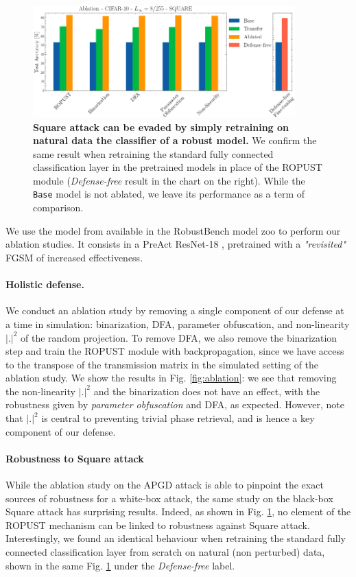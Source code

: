 \begin{figure}
    \centering
    \includegraphics[width=0.9\textwidth]{sections/appendix/ropust_icassp2022/ablation_square.png}
    \caption{\textbf{Square attack can be evaded by simply retraining on natural data the classifier of a robust model.} We confirm the same result when retraining the standard fully connected classification layer in the pretrained models in place of the ROPUST module (\textit{Defense-free} result in the chart on the right). While the \texttt{Base} model is not ablated, we leave its performance as a term of comparison.}
    \label{fig:ablation_square}
\end{figure}
We use the model from \cite{Wong2020FastIB} available in the RobustBench model zoo to perform our ablation studies. It consists in a PreAct ResNet-18 \cite{He2016IdentityMI}, pretrained with a \textit{"revisited"} FGSM of increased effectiveness.
\paragraph{Holistic defense.}
We conduct an ablation study by removing a single component of our defense at a time in simulation: binarization, DFA, parameter obfuscation, and non-linearity $|.|^2$ of the random projection. To remove DFA, we also remove the binarization step and train the ROPUST module with backpropagation, since we have access to the transpose of the transmission matrix in the simulated setting of the ablation study. We show the results in Fig. \ref{fig:ablation}: we see that removing the non-linearity $|.|^2$ and the binarization does not have an effect, with the robustness given by \textit{parameter obfuscation} and DFA, as expected. However, note that $|.|^2$ is central to preventing trivial phase retrieval, and is hence a key component of our defense.  
\paragraph{Robustness to Square attack} 
While the ablation study on the APGD attack is able to pinpoint the exact sources of robustness for a white-box attack, the same study on the black-box Square attack has surprising results. Indeed, as shown in Fig. \ref{fig:ablation_square}, no element of the ROPUST mechanism can be linked to robustness against Square attack. Interestingly, we found an identical behaviour when retraining the standard fully connected classification layer from scratch on natural (non perturbed) data, shown in the same Fig. \ref{fig:ablation_square} under the \textit{Defense-free} label.

